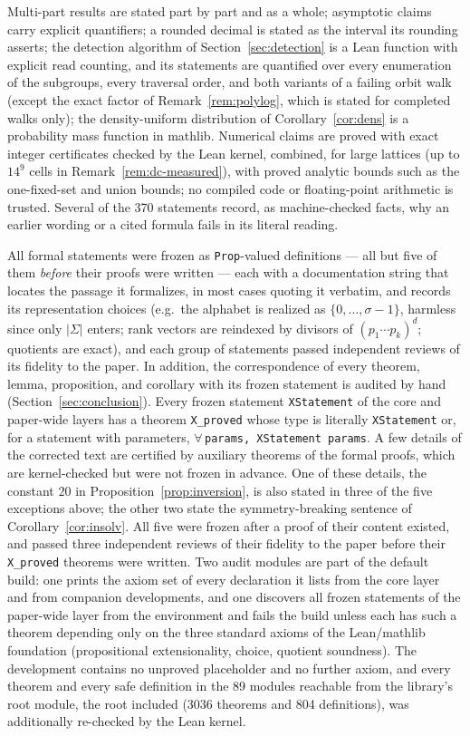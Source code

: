 \documentclass[11pt,a4paper]{article}
\theoremstyle{remark}
\begin{document}
Multi-part results
are stated part by part and as a whole; asymptotic claims carry explicit
quantifiers; a rounded decimal is stated as the interval its rounding
asserts; the detection algorithm of Section~\ref{sec:detection} is a Lean
function with explicit read counting, and its statements are quantified
over every enumeration of the subgroups, every traversal order, and both
variants of a failing orbit walk (except the exact factor of
Remark~\ref{rem:polylog}, which is stated for completed walks only); the
density-uniform distribution of
Corollary~\ref{cor:dens} is a probability mass function in
\textsf{mathlib}. Numerical claims are proved with exact integer
certificates checked by the Lean kernel, combined, for large lattices
(up to $14^9$ cells in Remark~\ref{rem:dc-measured}), with proved
analytic bounds such as the one-fixed-set and union bounds; no compiled
code or floating-point arithmetic is trusted.
Several of the 370 statements record, as machine-checked facts, why an
earlier wording or a cited formula fails in its literal reading.

All formal statements were frozen as \texttt{Prop}-valued definitions --- all but
five of them \emph{before} their proofs were written --- each with a documentation string
that locates the passage it formalizes, in most cases quoting it
verbatim, and records its representation choices
(e.g.\ the alphabet is realized as $\{0,\dots,\sigma-1\}$, harmless since
only $|\Sigma|$ enters; rank vectors are reindexed by divisors of
$(p_1\cdots p_k)^d$; quotients are exact), and each group of statements
passed independent reviews of its fidelity to the paper. In addition, the
correspondence of every theorem, lemma, proposition, and corollary with its
frozen statement is audited by hand (Section~\ref{sec:conclusion}). Every frozen
statement \texttt{XStatement} of the core and paper-wide layers has a
theorem \texttt{X\_proved} whose type is literally \texttt{XStatement}
or, for a statement with parameters,
$\forall$\,\texttt{params, XStatement params}. A few details of the
corrected text are certified by auxiliary theorems of the formal proofs, which are kernel-checked but were not frozen in
advance. One of these details, the constant $20$ in Proposition~\ref{prop:inversion}, is also stated in three of the five
exceptions above; the other two state the symmetry-breaking sentence of Corollary~\ref{cor:insolv}. All five were frozen
after a proof of their content existed, and passed three independent reviews of their fidelity to the paper before their
\texttt{X\_proved} theorems were written. Two audit modules are part of the default build: one prints the
axiom set of every declaration it lists from the core layer and from
companion developments, and one discovers all frozen statements of the
paper-wide layer from the environment and fails the build unless each
has such a theorem depending only on the three standard axioms of the Lean/mathlib
foundation (propositional extensionality, choice, quotient soundness). The
development contains no unproved placeholder and no further axiom, and
every theorem and every safe definition in the 89 modules
reachable from the library's root module, the root included
(3036 theorems and 804 definitions), was additionally
re-checked by the Lean kernel.
\end{document}
